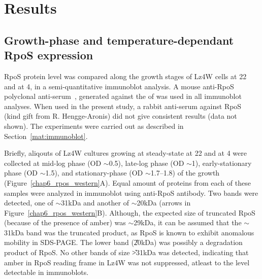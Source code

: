 \section{Results}

\subsection[RpoS expression]{Growth-phase and temperature-dependant RpoS expression}
\label{chap6:rpos_expression}

RpoS protein level was compared along the growth stages of Lz4W
cells at 22\dg{} and at 4\dg{}, in a semi-quantitative immunoblot
analysis. A mouse anti-RpoS polyclonal anti-serum~\citep[kind gift
from M. Kivisaar]{Ojangu2000}, generated against the \sigs{} of
 was used in all immunoblot analyses. When used in the
present study, a rabbit anti-serum against  RpoS (kind
gift from R. Hengge-Aronis) did not give consistent results (data
not shown). The experiments were carried out as described in
Section~\ref{mat:immunoblot}.

Briefly, aliqouts of Lz4W cultures growing at steady-state at
22\dg{} and at 4\dg{} were collected at mid-log phase (OD
$\sim$0.5), late-log phase (OD $\sim$1),
early-sta\-tionary phase (OD $\sim$1.5), and
stationary-phase (OD $\sim$1.7--1.8) of the growth
(Figure~\ref{chap6_rpos_western}A). Equal amount of proteins from
each of these samples were analyzed in immunoblot using anti-RpoS
antibody. Two bands were detected, one of \U{$\sim$31}{kDa} and
another of \U{$\sim$20}{kDa} (arrows in
Figure~\ref{chap6_rpos_western}B). Although, the expected size of
truncated RpoS (because of the presence of amber) was
\U{$\sim$29}{kDa}, it can be assumed that the \U{$\sim$31}{kDa}
band was the truncated product, as RpoS is known to exhibit
anomalous mobility in SDS-PAGE. The lower band (\U{20}{kDa}) was
possibly a degradation product of RpoS. No other bands of size
\U{>31}{kDa} was detected, indicating that amber in RpoS reading
frame in Lz4W was not suppressed, atleast to the level detectable
in immunoblots.

